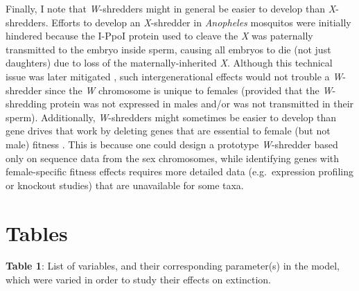 \documentclass[]{rsos}%
\begin{document}
Finally, I note that \emph{W}-shredders might in general be easier to
develop than \emph{X}-shredders. Efforts to develop an \emph{X}-shredder
in \emph{Anopheles} mosquitos were initially hindered because the I-PpoI
protein used to cleave the \emph{X} was paternally transmitted to the
embryo inside sperm, causing all embryos to die (not just daughters) due
to loss of the maternally-inherited \emph{X}. Although this technical
issue was later mitigated \citep{galizi2014sy}, such intergenerational
effects would not trouble a \emph{W}-shredder since the \emph{W}
chromosome is unique to females (provided that the \emph{W}-shredding
protein was not expressed in males and/or was not transmitted in their
sperm). Additionally, \emph{W}-shredders might sometimes be easier to
develop than gene drives that work by deleting genes that are essential
to female (but not male) fitness \citep[e.g.][]{burt2018se}. This is
because one could design a prototype \emph{W}-shredder based only on
sequence data from the sex chromosomes, while identifying genes with
female-specific fitness effects requires more detailed data
(e.g.~expression profiling or knockout studies) that are unavailable for
some taxa.

\newpage

\hypertarget{tables}{%
\section{Tables}\label{tables}}

\textbf{Table 1}: List of variables, and their corresponding
parameter(s) in the model, which were varied in order to study their
effects on extinction.
\end{document}
